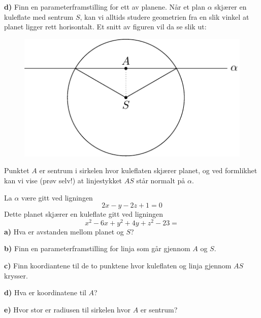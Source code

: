 \textbf{d)} Finn en parameterframstilling for ett av planene.
\newpage
{}
Når et plan $ \alpha $ skjærer en kuleflate med sentrum $ S $, kan vi alltids studere geometrien fra en slik vinkel at planet ligger rett horisontalt. Et snitt av figuren vil da se slik ut:
\begin{figure}
	\centering
	\includegraphics[]{../../fig/plkul}
\end{figure}
Punktet $ A $ er sentrum i sirkelen hvor kuleflaten skjærer planet, og ved formlikhet kan vi vise (prøv selv!) at linjestykket $ AS $ står normalt på $ \alpha $.\os

La $ \alpha $ være gitt ved ligningen 
\[ 2x - y - 2z +1=0   \] 
Dette planet skjærer en kuleflate gitt ved ligningen
\[x^2 - 6x + y^2 + 4y + z^2 -23 = \]
\textbf{a)} Hva er avstanden mellom planet og $ S $?\os

\textbf{b)} Finn en parameterframstilling for linja som går gjennom $ A $ og $ S $.\os

\textbf{c)} Finn koordiantene til de to punktene hvor kuleflaten og linja gjennom $ AS $ krysser.\os

\textbf{d)} Hva er koordinatene til $ A $?\os

\textbf{e)} Hvor stor er radiusen til sirkelen hvor $ A $ er sentrum?

